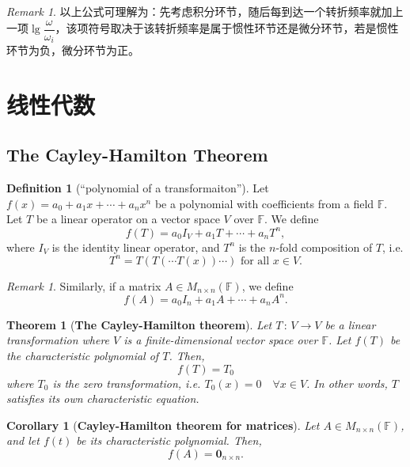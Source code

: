 \documentclass[14pt,a4paper]{article}
\theoremstyle{plain}
\newtheorem*{nnt}{Theorem}
\theoremstyle{definition}
\newtheorem*{dfn}{Definition}
\theoremstyle{remark}
\newtheorem{rmk}{Remark}[section]
\newtheorem*{nnr}{Remark}
\theoremstyle{plain}
\theoremstyle{plain}
\newtheorem*{nnc}{Corollary}
\theoremstyle{plain}
\theoremstyle{definition}
\theoremstyle{remark}
\numberwithin{equation}{section}
\begin{document}
			\begin{nnr}  
				以上公式可理解为：先考虑积分环节，随后每到达一个转折频率就加上一项$\lg \dfrac{\omega}{\omega_i}$，该项符号取决于该转折频率是属于惯性环节还是微分环节，若是惯性环节为负，微分环节为正。
			\end{nnr} 
	
	\section{线性代数}%
	\label{sec:线性代数}
		
			\subsection{The Cayley-Hamilton Theorem}%
			\label{sub:the_cayley_hamilton_theorem}
			
				\begin{dfn}[``polynomial of a transformaiton'']  
				\label{dfn:_polynomial_of_a_transformaiton_}
				Let $f(x)=a_0+a_1x+\cdots +a_{n}x^{n}$ be a polynomial with coefficients from a field $\mathbb{F}$. Let $T$ be a linear operator on a vector space $V$ over $\mathbb{F}$. We define
				\[
					f(T) = a_0 I_V + a_1T + \cdots + a_{n}T^{n}
				,\]
				where $I_V$ is the identity linear operator, and $T^{n}$ is the $n$-fold composition of $T$, i.e. 
				\[
					T^{n} = T(T(\cdots T(x))\cdots ) \text{ for all } x\in V
				.\] 
				\end{dfn} 

				\begin{rmk}  
					Similarly, if a matrix $A\in M_{n\times n}(\mathbb{F})$, we define 
					\[
						f(A) = a_0 I_{n} + a_1A + \cdots  + a_{n} A^{n}
					.\] 
				\end{rmk} 

				\begin{nnt}[\textbf{The Cayley-Hamilton theorem}] 
				\label{the:ch}
					Let $T \,:\, V\to V$ be a linear transformation where $V$ is a finite-dimensional vector space over $\mathbb{F}$. Let $f(T)$ be the characteristic polynomial of $T$. Then, 
					\[
						f(T) = T_0
					\] 
					where $T_0$ is the zero transformation, i.e. $T_0(x)=0 \quad \forall x\in V$. In other words, $T$ satisfies its own characteristic equation.  
				\end{nnt} 

				\begin{nnc}[\textbf{Cayley-Hamilton theorem for matrices}] 
				\label{cor:ch_mtrx}
				Let $A\in M_{n\times n}(\mathbb{F})$, and let $f(t)$ be its characteristic polynomial. Then, 
				\[
					f(A) = \textbf{0}_{n\times n}
				.\] 
				\end{nnc} 
\end{document}
